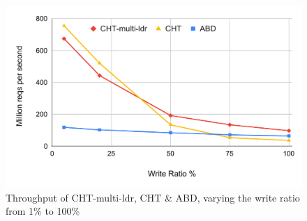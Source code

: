 \begin{figure}[t]
  \centering
  \includegraphics[scale=0.4]{1_figures/chtml-cht-abd.pdf}
  \caption{Throughput of CHT-multi-ldr, CHT \& ABD, varying the write ratio from 1\% to 100\%}
  \label{fig:cht-cht-abd}
\end{figure}